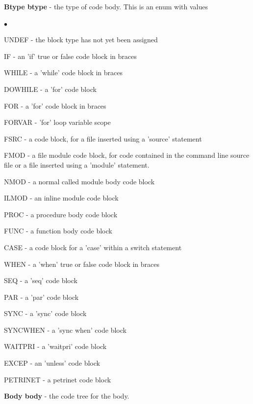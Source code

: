 \documentclass[10pt,a4paper,twoside,fleqn]{book}
\newcommand{\blist}{\begin{list}{$\bullet$}{\setlength{\itemsep}{-5pt}\setlength{\topsep}{-5pt}}}
\newcommand{\blend}{\end{list}}
\begin{document}
            {\bf Btype btype} - the type of code body. This is an enum with
            values
            \blist
            \item   UNDEF       - the block type has not yet been assigned
            \item   IF          - an 'if' true or false code block in braces
            \item   WHILE       - a 'while' code block in braces
            \item   DOWHILE     - a 'for' code block
            \item   FOR         - a 'for' code block in braces
            \item   FORVAR      - 'for' loop variable scope
            \item   FSRC        - a code block, for a file inserted using
                                  a 'source' statement
            \item   FMOD        - a file module code block, for code contained in
                                  the command line source file or a file inserted
                                  using a 'module' statement.
            \item   NMOD        - a normal called module body code block
            \item   ILMOD       - an inline module code block
            \item   PROC        - a procedure body code block
            \item   FUNC        - a function body code block
            \item   CASE        - a code block for a 'case' within a switch statement
            \item   WHEN        - a 'when' true or false code block in braces
            \item   SEQ         - a 'seq' code block
            \item   PAR         - a 'par' code block
            \item   SYNC        - a 'sync' code block
            \item   SYNCWHEN    - a 'sync when' code block
            \item   WAITPRI     - a 'waitpri' code block
            \item   EXCEP       - an 'unless' code block
            \item   PETRINET    - a petrinet code block
            \blend

            {\bf Body body} - the code tree for the body.
\end{document}
